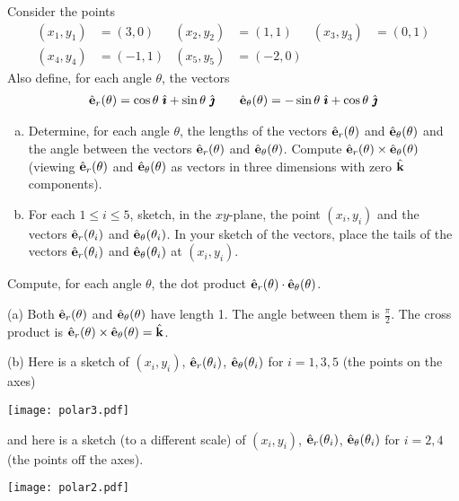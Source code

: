 \begin{question}\label{prb polar vectors}
Consider the points
\begin{align*}
(x_1,y_1) &= (3,0) &
(x_2,y_2) &= (1,1)  &
(x_3,y_3) &= (0,1) \\
(x_4,y_4) &= (-1,1) &
(x_5,y_5) &= (-2,0)
\end{align*}
Also define, for each angle $\theta$, the vectors
\begin{align*}
\hat{\mathbf{e}}_r(\theta)=\cos\theta\ \hat{\pmb{\imath}} + \sin\theta\ \hat{\pmb{\jmath}}\qquad
\hat{\mathbf{e}}_\theta(\theta) = -\sin\theta\ \hat{\pmb{\imath}} + \cos\theta\ \hat{\pmb{\jmath}}
\end{align*}
\begin{enumerate}[(a)]
\item
Determine, for each angle $\theta$, the lengths of the vectors
$\hat{\mathbf{e}}_r(\theta)$ and $\hat{\mathbf{e}}_\theta(\theta)$ and the angle between 
the vectors $\hat{\mathbf{e}}_r(\theta)$ and $\hat{\mathbf{e}}_\theta(\theta)$. Compute
$\hat{\mathbf{e}}_r(\theta)\times\hat{\mathbf{e}}_\theta(\theta)$ (viewing $\hat{\mathbf{e}}_r(\theta)$ and $\hat{\mathbf{e}}_\theta(\theta)$ as vectors in three dimensions with zero $\hat{\mathbf{k}}$ 
components).
\item
For each $1\le i\le 5$, sketch, in the $xy$-plane, the point $(x_i,y_i)$
and the vectors $\hat{\mathbf{e}}_r(\theta_i)$ and $\hat{\mathbf{e}}_\theta(\theta_i)$. In your
sketch of the vectors, place the tails of the vectors 
$\hat{\mathbf{e}}_r(\theta_i)$ and $\hat{\mathbf{e}}_\theta(\theta_i)$ at $(x_i,y_i)$.
\end{enumerate}
\end{question}

\begin{hint} 
Compute, for each angle $\theta$, the dot product $\hat{\mathbf{e}}_r(\theta)\cdot\hat{\mathbf{e}}_\theta(\theta)$.
\end{hint}

\begin{answer} 
(a) Both $\hat{\mathbf{e}}_r(\theta)$ and $\hat{\mathbf{e}}_\theta(\theta)$ have length 1.
The angle between them is $\frac{\pi}{2}$. The cross product is
$\hat{\mathbf{e}}_r(\theta) \times \hat{\mathbf{e}}_\theta(\theta)=\hat{\mathbf{k}}$.

(b)
Here is a sketch of $(x_i,y_i)$, $\hat{\mathbf{e}}_r(\theta_i)$,
$\hat{\mathbf{e}}_\theta(\theta_i)$ for $i =1,3,5$ (the points on the axes)
\begin{center}
  \texttt{[image: polar3.pdf]}
\end{center}
and here is a sketch (to a different scale) of $(x_i,y_i)$, $\hat{\mathbf{e}}_r(\theta_i)$,
$\hat{\mathbf{e}}_\theta(\theta_i)$ for $i =2,4$ (the points off the axes).
\begin{center}       
  \texttt{[image: polar2.pdf]}
\end{center}
\end{answer}


